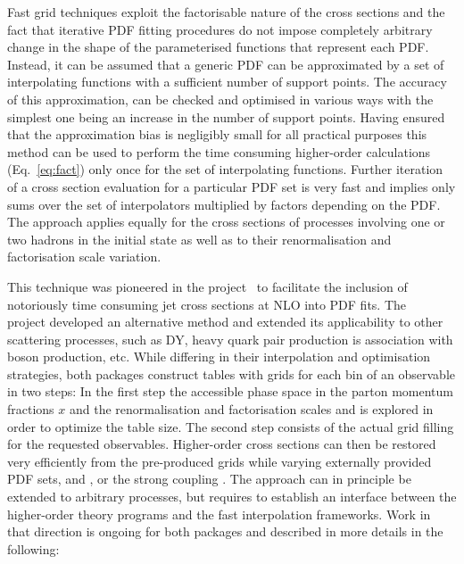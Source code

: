   Fast grid techniques exploit the factorisable nature of the cross sections and 
  the fact that iterative PDF fitting
  procedures do not impose completely arbitrary change in the shape
  of the parameterised functions that represent each PDF\@.
  Instead, it can be assumed that a generic PDF can be approximated by
  a set of interpolating functions with a sufficient number of
support points. The 
  accuracy of this approximation, can be checked and optimised 
  in various ways with the simplest one being an increase in the number of
  support points. Having ensured that the approximation bias
  is negligibly
  small for all practical purposes this method can be used to perform
  the time consuming higher-order calculations (Eq.~\ref{eq:fact})
  only once for the set of interpolating functions. 
  Further iteration of a cross section evaluation for
  a particular PDF set is very fast and implies only sums over
  the set of interpolators multiplied by factors depending on the
  PDF\@. The approach applies equally 
  for the cross sections of
  processes involving one or two hadrons in the initial state as well
  as to their renormalisation and factorisation scale variation.

  This technique was pioneered in the \fastnlo
  project~\cite{Kluge:2006xs} to facilitate the inclusion of
  notoriously time consuming jet cross sections at NLO into PDF fits.
  The \applgrid~\cite{Carli:2010rw} project developed an alternative method
  and extended its applicability  to other scattering processes, such as
   DY, heavy quark pair production is association with boson production, etc.
  While differing in their interpolation
  and optimisation strategies, both packages construct tables with
  grids for each bin of an observable in two steps: In the first step
  the accessible phase space in the parton momentum fractions $x$ and
  the renormalisation and factorisation scales \mur and \muf is
  explored in order to optimize the table size. The second step
  consists of the actual grid filling for the
  requested observables. Higher-order cross sections can then be
  restored very efficiently from the pre-produced grids while varying
  externally provided PDF sets, \mur and \muf, or the strong coupling
  \asq\@. The approach can in principle be extended to arbitrary
  processes, but requires to establish an interface between the
  higher-order theory programs and the fast interpolation
  frameworks. Work in that direction is ongoing for both packages
  and described in more details in the following:

